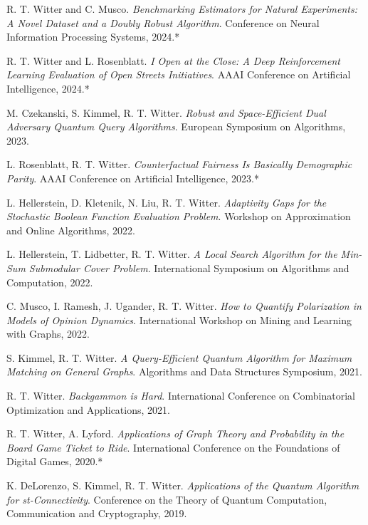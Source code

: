 \documentclass[11pt,a4paper,sans]{moderncv}
\begin{document}
\begin{enumerate}[label={[\arabic*]},align=left]
    \setcounter{enumi}{5}
    \item R. T. Witter and C. Musco. \textit{Benchmarking Estimators for Natural Experiments: A Novel Dataset and a Doubly Robust Algorithm}. Conference on Neural Information Processing Systems, 2024.*
    \item R. T. Witter and  L. Rosenblatt. \textit{I Open at the Close: A Deep Reinforcement Learning Evaluation of Open Streets Initiatives}. AAAI Conference on Artificial Intelligence, 2024.*
    \item M. Czekanski, S. Kimmel, R. T. Witter. \textit{Robust and Space-Efficient Dual Adversary Quantum Query Algorithms}. European Symposium on Algorithms, 2023.
    \item L. Rosenblatt, R. T. Witter. \textit{Counterfactual Fairness Is Basically Demographic Parity}. AAAI Conference on Artificial Intelligence, 2023.*
    \item L. Hellerstein, D. Kletenik, N. Liu, R. T. Witter. \textit{Adaptivity Gaps for the Stochastic Boolean Function Evaluation Problem}. Workshop on Approximation and Online Algorithms, 2022.
    \item L. Hellerstein, T. Lidbetter, R. T. Witter. \textit{A Local Search Algorithm for the Min-Sum Submodular Cover Problem}. International Symposium on Algorithms and Computation, 2022.
    \item C. Musco, I. Ramesh, J. Ugander, R. T. Witter. \textit{How to Quantify Polarization in Models of Opinion Dynamics}. International Workshop on Mining and Learning with Graphs, 2022.
    \item S. Kimmel, R. T. Witter. \textit{A Query-Efficient Quantum Algorithm for Maximum Matching on General Graphs}. Algorithms and Data Structures Symposium, 2021.
    \item R. T. Witter. \textit{Backgammon is Hard}. International Conference on Combinatorial Optimization and Applications, 2021.
    \item R. T. Witter, A. Lyford. \textit{Applications of Graph Theory and Probability in the Board Game Ticket to Ride}. International Conference on the Foundations of Digital Games, 2020.*
    \item K. DeLorenzo, S. Kimmel, R. T. Witter. \textit{Applications of the Quantum Algorithm for st-Connectivity}. Conference on the Theory of Quantum Computation, Communication and Cryptography, 2019.
\end{enumerate}
\end{document}
